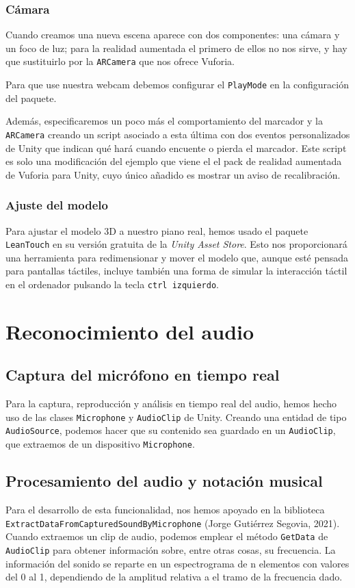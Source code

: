 \subsubsection{Cámara}
Cuando creamos una nueva escena aparece con dos componentes: una cámara y un foco
de luz; para la realidad aumentada el primero de ellos no nos sirve, y hay que sustituirlo
por la \texttt{ARCamera} que nos ofrece Vuforia.

Para que use nuestra webcam debemos configurar el \texttt{PlayMode} en la configuración
del paquete.

Además, especificaremos un poco más el comportamiento del marcador y la \texttt{ARCamera} creando un script 
asociado a esta última con dos eventos personalizados de Unity que indican qué hará cuando encuente o pierda el marcador.
Este script es solo una modificación del ejemplo que viene el el pack de realidad aumentada de Vuforia para Unity, cuyo único añadido es 
mostrar un aviso de recalibración.

\subsubsection{Ajuste del modelo}
Para ajustar el modelo 3D a nuestro piano real, hemos usado el paquete \texttt{LeanTouch}
en su versión gratuita de la \textit{Unity Asset Store}. Esto nos proporcionará una
herramienta para redimensionar y mover el modelo que, aunque esté pensada para pantallas
táctiles, incluye también una forma de simular la interacción táctil en el ordenador pulsando la tecla \texttt{ctrl izquierdo}.

\section{Reconocimiento del audio}\label{audio}
\subsection{Captura del micrófono en tiempo real}
Para la captura, reproducción y análisis en tiempo real del audio, hemos hecho uso de
las clases \texttt{Microphone} y \texttt{AudioClip} de Unity. Creando una entidad de tipo
\texttt{AudioSource}, podemos hacer que su contenido sea guardado en un \texttt{AudioClip}, que
extraemos de un dispositivo \texttt{Microphone}.

\subsection{Procesamiento del audio y notación musical}
Para el desarrollo de esta funcionalidad, nos hemos apoyado en la biblioteca \\
\texttt{ExtractDataFromCapturedSoundByMicrophone} (Jorge Gutiérrez Segovia, 2021).
Cuando extraemos un clip de audio, podemos emplear el método
\texttt{GetData} de \texttt{AudioClip} para obtener información sobre, entre otras cosas, su frecuencia. La
información del sonido se reparte en un espectrograma de n elementos con valores
del 0 al 1, dependiendo de la amplitud relativa a el tramo de la frecuencia
dado.

